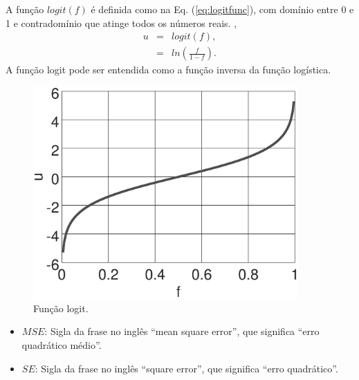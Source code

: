 \noindent
\begin{minipage}{0.55\textwidth}
\begin{definition}\label{def:logitfunc}
A função $logit(f)$ é definida como na Eq. (\ref{eq:logitfunc}), 
com domínio entre 0 e 1 e 
contradomínio que atinge todos os números reais. \cite[pp. 17]{kleinbaum2010logistic},
\begin{equation}\label{eq:logitfunc}
\begin{matrix}
u & = & logit(f),\\
~ & = & ln\left( \frac{f}{1-f}\right).
\end{matrix}
\end{equation}
A função logit pode ser entendida como a função inversa da função logística.
\end{definition}
\end{minipage}
\begin{minipage}{0.45\textwidth}
     \begin{figure}[H]
         \centering
         \includegraphics[width=0.9\textwidth]{chapters/classificacao/mfiles/logisticfunc/logit.eps}
         \caption{Função logit. }
         \label{fig:logitfunc}
     \end{figure}
\end{minipage}
\begin{tcbattention}
\begin{itemize}
\item $MSE$: Sigla da frase no inglês ``mean square error'', que significa ``erro quadrático médio''.
\item $SE$: Sigla da frase no inglês ``square error'', que significa ``erro quadrático''.
\end{itemize}
\end{tcbattention}
